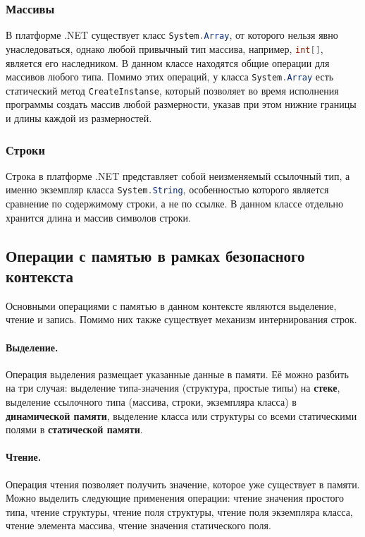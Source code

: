 \subsubsection{Массивы}
В платформе .NET существует класс \lstinline[language=csharp]{System.Array}, от которого нельзя явно унаследоваться, однако любой привычный тип массива, например, \lstinline[language=csharp]{int[]}, является его наследником. В данном классе находятся общие операции для массивов любого типа. Помимо этих операций, у класса \lstinline[language=csharp]{System.Array} есть статический метод \lstinline[language=csharp]{CreateInstanse}, который позволяет во время исполнения программы создать массив любой размерности, указав при этом нижние границы и длины каждой из размерностей.
\subsubsection{Строки}
Строка в платформе .NET представляет собой неизменяемый ссылочный тип, а именно экземпляр класса \lstinline[language=csharp]{System.String}, особенностью которого является сравнение по содержимому строки, а не по ссылке. В данном классе отдельно хранится длина и массив символов строки.

\subsection{Операции с памятью в рамках безопасного контекста}

Основными операциями с памятью в данном контексте являются выделение, чтение и запись. Помимо них также существует механизм интернирования строк.

\paragraph{Выделение.} Операция выделения размещает указанные данные в памяти. Её можно разбить на три случая: выделение типа-значения (структура, простые типы) на \textbf{стеке}, выделение ссылочного типа (массива, строки, экземпляра класса) в \textbf{динамической памяти}, выделение класса или структуры со всеми статическими полями в \textbf{статической памяти}.

\paragraph{Чтение.} Операция чтения позволяет получить значение, которое уже существует в памяти. Можно выделить следующие применения операции: чтение значения простого типа, чтение структуры, чтение поля структуры, чтение поля экземпляра класса, чтение элемента массива, чтение значения статического поля.

